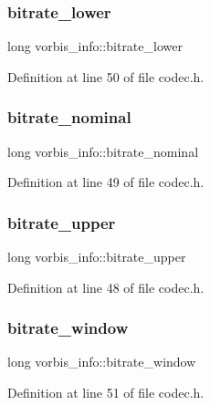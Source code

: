\subsubsection{\texorpdfstring{bitrate\_lower}{bitrate\_lower}}
{\footnotesize\ttfamily long vorbis\+\_\+info\+::bitrate\+\_\+lower}



Definition at line 50 of file codec.\+h.

\mbox{\label{structvorbis__info_a71127d3e35c30fa110d7f321302a91b8}} 
\subsubsection{\texorpdfstring{bitrate\_nominal}{bitrate\_nominal}}
{\footnotesize\ttfamily long vorbis\+\_\+info\+::bitrate\+\_\+nominal}



Definition at line 49 of file codec.\+h.

\mbox{\label{structvorbis__info_a2d9d0e0725ae71c855ad39ce07bf7c88}} 
\subsubsection{\texorpdfstring{bitrate\_upper}{bitrate\_upper}}
{\footnotesize\ttfamily long vorbis\+\_\+info\+::bitrate\+\_\+upper}



Definition at line 48 of file codec.\+h.

\mbox{\label{structvorbis__info_aa511ecfc9eee8129df8f70e62ed08dc7}} 
\subsubsection{\texorpdfstring{bitrate\_window}{bitrate\_window}}
{\footnotesize\ttfamily long vorbis\+\_\+info\+::bitrate\+\_\+window}



Definition at line 51 of file codec.\+h.

